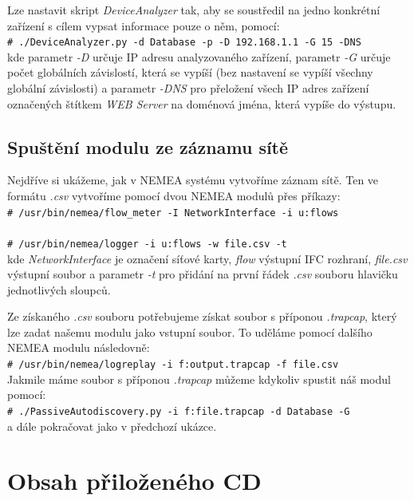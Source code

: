 \documentclass[thesis=B,czech,hidelinks]{FITthesis}[2019/03/21]
\newcommand{\shellcmd}[1]{\\\indent\indent\texttt{\footnotesize\# #1}\\}
\begin{document}
        Lze nastavit skript \emph{DeviceAnalyzer} tak, aby se soustředil na jedno konkrétní zařízení s cílem vypsat informace pouze o něm, pomocí:
        \shellcmd{./DeviceAnalyzer.py -d Database -p -D 192.168.1.1 -G 15 -DNS}
         kde parametr \emph{-D} určuje IP adresu analyzovaného zařízení, parametr \emph{-G} určuje počet globálních závislostí, která se vypíší (bez nastavení se vypíší všechny globální závislosti) a parametr \emph{-DNS} pro přeložení všech IP adres zařízení označených štítkem \emph{WEB Server} na doménová jména, která vypíše do výstupu.
        
        \section{Spuštění modulu ze záznamu sítě}
        Nejdříve si ukážeme, jak v NEMEA systému vytvoříme záznam sítě. Ten ve formátu \emph{.csv} vytvoříme pomocí dvou NEMEA modulů přes příkazy:
        \shellcmd{/usr/bin/nemea/flow\_meter -I NetworkInterface -i u:flows}
        \shellcmd{/usr/bin/nemea/logger -i u:flows -w file.csv -t}
         kde \emph{NetworkInterface} je označení síťové karty, \emph{flow} výstupní IFC rozhraní, \emph{file.csv} výstupní soubor a parametr \emph{-t} pro přidání na první řádek \emph{.csv} souboru hlavičku jednotlivých sloupců.
        
        Ze získaného \emph{.csv} souboru potřebujeme získat soubor s příponou \emph{.trapcap}, který lze zadat našemu modulu jako vstupní soubor. To uděláme pomocí dalšího NEMEA modulu následovně: 
        \shellcmd{/usr/bin/nemea/logreplay -i f:output.trapcap -f file.csv}
        
        Jakmile máme soubor s příponou \emph{.trapcap} můžeme kdykoliv spustit náš modul pomocí:
        \shellcmd{./PassiveAutodiscovery.py -i f:file.trapcap -d Database -G}
        a dále pokračovat jako v předchozí ukázce.
\chapter{Obsah přiloženého CD}


\begin{figure}
\end{figure}
\end{document}
